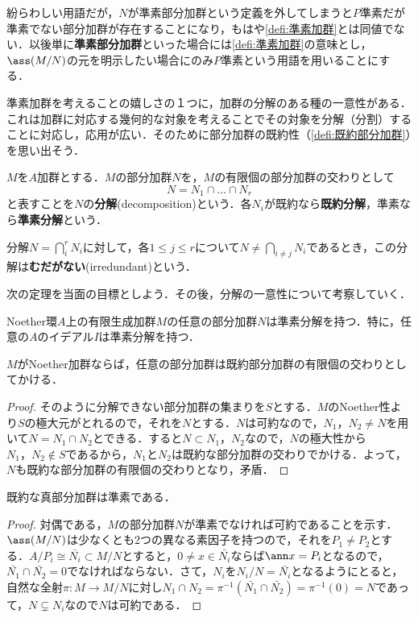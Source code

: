 紛らわしい用語だが，$N$が準素部分加群という定義を外してしまうと$P$準素だが準素でない部分加群が存在することになり，もはや\ref{defi:準素加群}とは同値でない．以後単に\textbf{準素部分加群}といった場合には\ref{defi:準素加群}の意味とし，$\ass(M/N)$の元を明示したい場合にのみ$P$準素という用語を用いることにする．

準素加群を考えることの嬉しさの１つに，加群の分解のある種の一意性がある．これは加群に対応する幾何的な対象を考えることでその対象を分解（分割）することに対応し，応用が広い．そのために部分加群の既約性（\ref{defi:既約部分加群}）を思い出そう．

\begin{defi}
	$M$を$A$加群とする．$M$の部分加群$N$を，$M$の有限個の部分加群の交わりとして
	\[N=N_1\cap\dots\cap N_r\]
	と表すことを$N$の\textbf{分解}(decomposition)という．各$N_i$が既約なら\textbf{既約分解}，準素なら\textbf{準素分解}という．
\end{defi}

分解$N=\bigcap_{i}^r N_i$に対して，各$1\leq j\leq r$について$N\neq \bigcap_{i\neq j}N_i$であるとき，この分解は\textbf{むだがない}(irredundant)という．

次の定理を当面の目標としよう．その後，分解の一意性について考察していく．

\begin{thm}\label{thm:Laker-Noetherの分解定理}
	Noether環$A$上の有限生成加群$M$の任意の部分加群$N$は準素分解を持つ．特に，任意の$A$のイデアル$I$は準素分解を持つ．
\end{thm}

\begin{lem}\label{lem:既約分解できる}
	$M$がNoether加群ならば，任意の部分加群は既約部分加群の有限個の交わりとしてかける．
\end{lem}
\begin{proof}
	そのように分解できない部分加群の集まりを$S$とする．$M$のNoether性より$S$の極大元がとれるので，それを$N$とする．$N$は可約なので，$N_1，N_2\neq N$を用いて$N=N_1\cap N_2$とできる．すると$N\subset N
	_1，N_2$なので，$N$の極大性から$N_1，N_2\not\in S$であるから，$N_1$と$N_2$は既約な部分加群の交わりでかける．よって，$N$も既約な部分加群の有限個の交わりとなり，矛盾．
\end{proof}
\begin{lem}\label{lem:既約なら準素}
	既約な真部分加群は準素である．
\end{lem}
\begin{proof}
	対偶である，$M$の部分加群$N$が準素でなければ可約であることを示す．$\ass (M/N)$は少なくとも2つの異なる素因子を持つので，それを$ P_1\neq P_2$とする．$A/ P_i\cong\bar{N_i}\subset M/N$とすると，$0\neq x\in\bar{N_i}$ならば$\ann x= P_i$となるので，$\bar{N_1}\cap\bar{N_2}=0$でなければならない．さて，$N_i$を$N_i/N=\bar{N_i}$となるようにとると，自然な全射$\pi:M\to M/N$に対し$N_1\cap N_2=\pi^{-1}(\bar{N_1}\cap\bar{N_2})=\pi^{-1}(0)=N$であって，$N\subsetneq N_i$なので$N$は可約である．
\end{proof}

